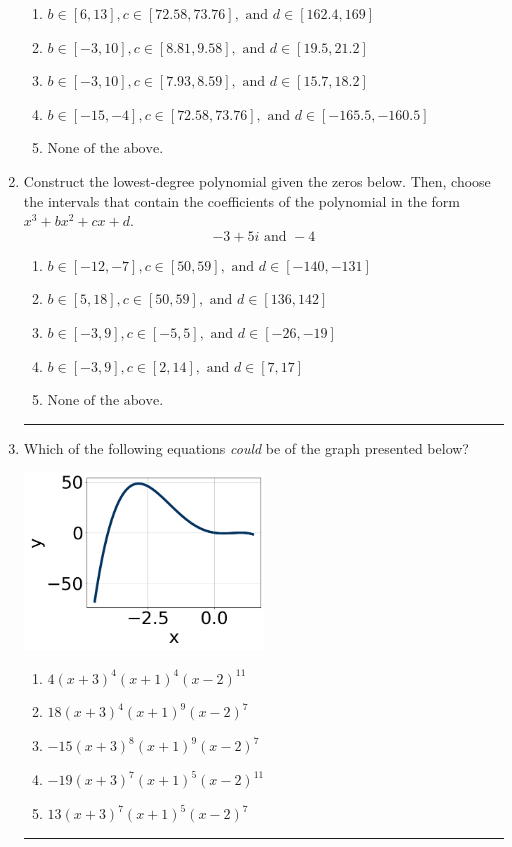 \documentclass[14pt]{extbook}
\newcommand{\litem}[1]{\item#1\hspace*{-1cm}\rule{\textwidth}{0.4pt}}
\begin{document}
\begin{enumerate}
{\begin{enumerate}[label=\Alph*.]
\item \( b \in [6, 13], c \in [72.58, 73.76], \text{ and } d \in [162.4, 169] \)
\item \( b \in [-3, 10], c \in [8.81, 9.58], \text{ and } d \in [19.5, 21.2] \)
\item \( b \in [-3, 10], c \in [7.93, 8.59], \text{ and } d \in [15.7, 18.2] \)
\item \( b \in [-15, -4], c \in [72.58, 73.76], \text{ and } d \in [-165.5, -160.5] \)
\item \( \text{None of the above.} \)

\end{enumerate} }
\litem{
Construct the lowest-degree polynomial given the zeros below. Then, choose the intervals that contain the coefficients of the polynomial in the form $x^3+bx^2+cx+d$.\[ -3 + 5 i \text{ and } -4 \]\begin{enumerate}[label=\Alph*.]
\item \( b \in [-12, -7], c \in [50, 59], \text{ and } d \in [-140, -131] \)
\item \( b \in [5, 18], c \in [50, 59], \text{ and } d \in [136, 142] \)
\item \( b \in [-3, 9], c \in [-5, 5], \text{ and } d \in [-26, -19] \)
\item \( b \in [-3, 9], c \in [2, 14], \text{ and } d \in [7, 17] \)
\item \( \text{None of the above.} \)

\end{enumerate} }
\litem{
Which of the following equations \textit{could} be of the graph presented below?
\begin{center}
    \includegraphics[width=0.5\textwidth]{../Figures/polyGraphToFunctionCopyB.png}
\end{center}
\begin{enumerate}[label=\Alph*.]
\item \( 4(x + 3)^{4} (x + 1)^{4} (x - 2)^{11} \)
\item \( 18(x + 3)^{4} (x + 1)^{9} (x - 2)^{7} \)
\item \( -15(x + 3)^{8} (x + 1)^{9} (x - 2)^{7} \)
\item \( -19(x + 3)^{7} (x + 1)^{5} (x - 2)^{11} \)
\item \( 13(x + 3)^{7} (x + 1)^{5} (x - 2)^{7} \)


\end{enumerate}}
\end{enumerate}
\end{document}
